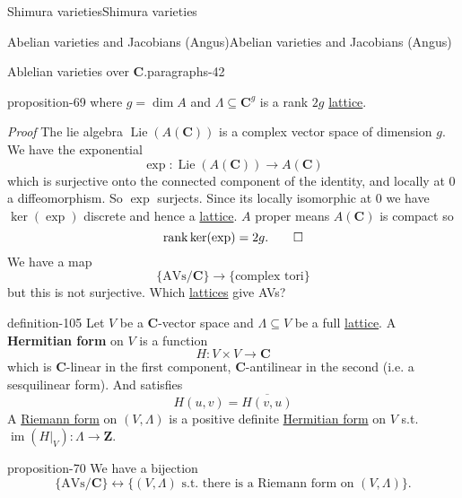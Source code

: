 \documentclass[10pt,]{book}
\makeatletter
\newcommand{\terminology}[1]{\textbf{#1}}
\renewcommand*{\proofname}{Proof}
\renewenvironment{proof}[1][\proofname]{\par
  \pushQED{\qed}%
  \normalfont \topsep6\p@\@plus6\p@\relax
  \trivlist
  \item\relax
    {\itshape
    #1\@addpunct{.}}\hspace\labelsep\ignorespaces
}{%
  \popQED\endtrivlist\@endpefalse
}
\numberwithin{equation}{section}
\newcommand{\Lie}{\operatorname{Lie}}
\newcommand{\ZZ}{\mathbf{Z}}
\newcommand{\CC}{\mathbf{C}}
\DeclareMathOperator{\rank}{rank}
\DeclareMathOperator{\im}{im}
\makeatother
\begin{document}
\begin{chapterptx}{Shimura varieties}{}{Shimura varieties}{}{}
\begin{sectionptx}{Abelian varieties and Jacobians (Angus)}{}{Abelian varieties and Jacobians (Angus)}{}{}
\begin{paragraphs}{Ablelian varieties over \(\CC\).}{paragraphs-42}
\begin{proposition}{}{}{proposition-69}
where \(g = \dim A\) and \(\Lambda \subseteq \CC^g\) is a rank \(2g\) \hyperref[def-buntes-lattice]{lattice}.%
\end{proposition}
\begin{proof}\hypertarget{proof-111}{}
\hypertarget{p-1096}{}%
The lie algebra \(\Lie(A(\CC))\) is a complex vector space of dimension \(g\). We have the exponential%
\begin{equation*}
\exp \colon \Lie(A(\CC)) \to A(\CC)
\end{equation*}
which is surjective onto the connected component of the identity, and locally at \(0\) a diffeomorphism. So \(\exp\) surjects. Since its locally isomorphic at \(0\) we have \(\ker(\exp)\) discrete and hence a \hyperref[def-buntes-lattice]{lattice}. \(A \) proper means \(A(\CC)\) is compact so%
\begin{equation*}
\rank \ker (\exp) = 2g\text{.}\qedhere
\end{equation*}
%
\end{proof}
\hypertarget{p-1097}{}%
We have a map%
\begin{equation*}
\{\text{AVs}/\CC\} \to \{\text{complex tori}\}
\end{equation*}
but this is not surjective. Which \hyperref[def-buntes-lattice]{lattices} give AVs?%
\begin{definition}{}{definition-105}%
\hypertarget{p-1098}{}%
Let \(V\) be a \(\CC\)-vector space and \(\Lambda \subseteq V\) be a full \hyperref[def-buntes-lattice]{lattice}. A \terminology{Hermitian form} on \(V\) is a function%
\begin{equation*}
H \colon V\times V \to \CC
\end{equation*}
which is \(\CC\)-linear in the first component, \(\CC\)-antilinear in the second (i.e. a sesquilinear form). And satisfies%
\begin{equation*}
H(u,v) = \overline{H(v,u)}
\end{equation*}
A \hyperref[def-riemann-form]{Riemann form} on \((V,\Lambda)\) is a positive definite \hyperref[sec-buntes-av-jac]{Hermitian form} on \(V\) s.t. \(\im(H|_V) \colon \Lambda \to \ZZ\).%
\end{definition}
\begin{proposition}{}{}{proposition-70}%
\hypertarget{p-1099}{}%
We have a bijection%
\begin{equation*}
\{\text{AVs}/\CC\} \leftrightarrow \{(V,\Lambda)\text{ s.t. there is a Riemann form on } (V, \Lambda)\}\text{.}
\end{equation*}
%
\end{proposition}

\end{paragraphs}
\end{sectionptx}
\end{chapterptx}
\end{document}
